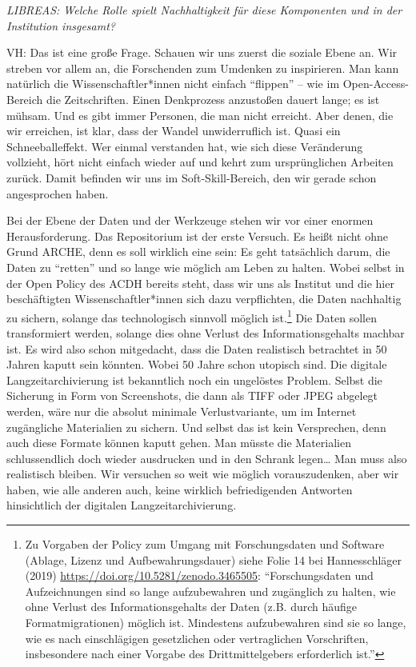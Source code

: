\documentclass[a4paper,
fontsize=11pt,
oneside,
numbers=noperiodatend,
parskip=half-,
bibliography=totoc,
final
]{scrartcl}
\begin{document}
\emph{LIBREAS: Welche Rolle spielt Nachhaltigkeit für diese Komponenten
und in der Institution insgesamt?}

VH: Das ist eine große Frage. Schauen wir uns zuerst die soziale Ebene
an. Wir streben vor allem an, die Forschenden zum Umdenken zu
inspirieren. Man kann natürlich die Wissenschaftler*innen nicht einfach
\enquote{flippen} -- wie im Open-Access-Bereich die Zeitschriften. Einen
Denkprozess anzustoßen dauert lange; es ist mühsam. Und es gibt immer
Personen, die man nicht erreicht. Aber denen, die wir erreichen, ist
klar, dass der Wandel unwiderruflich ist. Quasi ein Schneeballeffekt.
Wer einmal verstanden hat, wie sich diese Veränderung vollzieht, hört
nicht einfach wieder auf und kehrt zum ursprünglichen Arbeiten zurück.
Damit befinden wir uns im Soft-Skill-Bereich, den wir gerade schon
angesprochen haben.

Bei der Ebene der Daten und der Werkzeuge stehen wir vor einer enormen
Herausforderung. Das Repositorium ist der erste Versuch. Es heißt nicht
ohne Grund ARCHE, denn es soll wirklich eine sein: Es geht tatsächlich
darum, die Daten zu \enquote{retten} und so lange wie möglich am Leben zu
halten. Wobei selbst in der Open Policy des ACDH bereits steht, dass wir
uns als Institut und die hier beschäftigten Wissenschaftler*innen sich
dazu verpflichten, die Daten nachhaltig zu sichern, solange das
technologisch sinnvoll möglich ist.\footnote{Zu Vorgaben der Policy zum
  Umgang mit Forschungsdaten und Software (Ablage, Lizenz und
  Aufbewahrungsdauer) siehe Folie 14 bei Hannesschläger (2019)
  \url{https://doi.org/10.5281/zenodo.3465505}: \enquote{Forschungsdaten und
  Aufzeichnungen sind so lange aufzubewahren und zugänglich zu halten,
  wie ohne Verlust des Informationsgehalts der Daten (z.B. durch häufige
  Formatmigrationen) möglich ist. Mindestens aufzubewahren sind sie so
  lange, wie es nach einschlägigen gesetzlichen oder vertraglichen
  Vorschriften, insbesondere nach einer Vorgabe des Drittmittelgebers
  erforderlich ist.}} Die Daten sollen transformiert werden, solange
dies ohne Verlust des Informationsgehalts machbar ist. Es wird also
schon mitgedacht, dass die Daten realistisch betrachtet in 50 Jahren
kaputt sein könnten. Wobei 50 Jahre schon utopisch sind. Die digitale
Langzeitarchivierung ist bekanntlich noch ein ungelöstes Problem. Selbst
die Sicherung in Form von Screenshots, die dann als TIFF oder JPEG
abgelegt werden, wäre nur die absolut minimale Verlustvariante, um im
Internet zugängliche Materialien zu sichern. Und selbst das ist kein
Versprechen, denn auch diese Formate können kaputt gehen. Man müsste die
Materialien schlussendlich doch wieder ausdrucken und in den Schrank
legen\ldots{} Man muss also realistisch bleiben. Wir versuchen so weit
wie möglich vorauszudenken, aber wir haben, wie alle anderen auch, keine
wirklich befriedigenden Antworten hinsichtlich der digitalen
Langzeitarchivierung.
\end{document}
